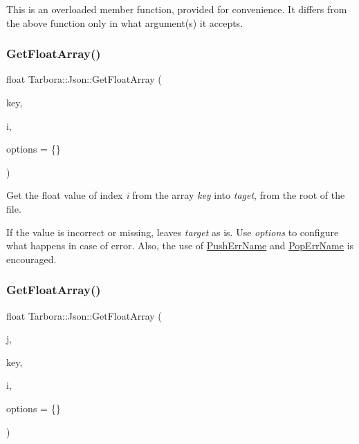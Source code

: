 This is an overloaded member function, provided for convenience. It differs from the above function only in what argument(s) it accepts. \mbox{\label{classTarbora_1_1Json_ad7793296ed4dc11c6cb53a36c8b998d8}} 
\subsubsection{\texorpdfstring{Get\+Float\+Array()}{GetFloatArray()}\hspace{0.1cm}{\footnotesize\ttfamily [1/2]}}
{\footnotesize\ttfamily float Tarbora\+::\+Json\+::\+Get\+Float\+Array (\begin{DoxyParamCaption}\item[{const char $\ast$}]{key,  }\item[{int}]{i,  }\item[{\hyperlink{structTarbora_1_1JsonOptions}{Json\+Options}}]{options = {\ttfamily \{\}} }\end{DoxyParamCaption})}



Get the float value of index {\itshape i} from the array {\itshape key} into {\itshape taget}, from the root of the file. 

If the value is incorrect or missing, leaves {\itshape target} as is. Use {\itshape options} to configure what happens in case of error. Also, the use of \hyperlink{classTarbora_1_1Json_a061eac4f16dac3b9b3a26a66de0ea8f0}{Push\+Err\+Name} and \hyperlink{classTarbora_1_1Json_a14019f06d3bd76edd6a6e78134519d11}{Pop\+Err\+Name} is encouraged. \mbox{\label{classTarbora_1_1Json_aae2be9fc9dc68d31de55d1e7fb5354fe}} 
\subsubsection{\texorpdfstring{Get\+Float\+Array()}{GetFloatArray()}\hspace{0.1cm}{\footnotesize\ttfamily [2/2]}}
{\footnotesize\ttfamily float Tarbora\+::\+Json\+::\+Get\+Float\+Array (\begin{DoxyParamCaption}\item[{raw\+\_\+json}]{j,  }\item[{const char $\ast$}]{key,  }\item[{int}]{i,  }\item[{\hyperlink{structTarbora_1_1JsonOptions}{Json\+Options}}]{options = {\ttfamily \{\}} }\end{DoxyParamCaption})}



